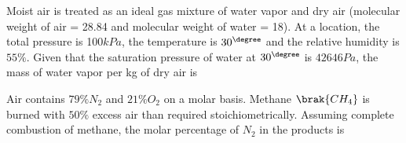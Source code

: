     \item Moist air is treated as an ideal gas mixture of water vapor and dry air 
        (molecular weight of air = 28.84 and molecular weight of water = 18). At a 
        location, the total pressure is 100$kPa$, the temperature is $30 ^{\degree}$ and the 
        relative humidity is $55\%$. Given that the saturation pressure of water at $30 ^{\degree}$
        is $42646 Pa$, the mass of water vapor per kg of dry air is
        \hfill{}
        

    \item Air contains $79\% N_2$ and $21 \% O_2$ on a molar basis. Methane $\brak{CH_4}$ is 
        burned with $50\%$ excess air than required stoichiometrically. Assuming complete combustion 
        of methane, the molar percentage of $N_2$ in the products is
        \hfill{}


